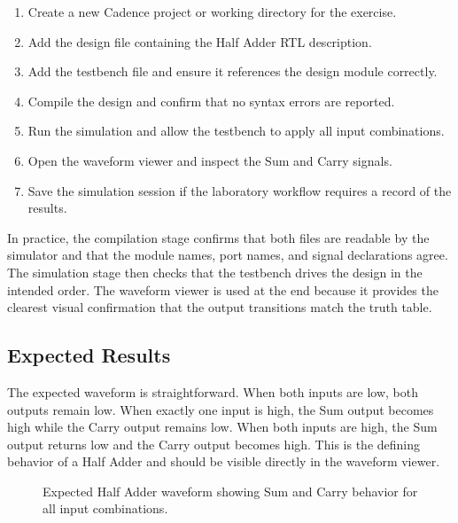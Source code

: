 \begin{enumerate}
    \item Create a new Cadence project or working directory for the exercise.
    \item Add the design file containing the Half Adder RTL description.
    \item Add the testbench file and ensure it references the design module correctly.
    \item Compile the design and confirm that no syntax errors are reported.
    \item Run the simulation and allow the testbench to apply all input combinations.
    \item Open the waveform viewer and inspect the Sum and Carry signals.
    \item Save the simulation session if the laboratory workflow requires a record of the results.
\end{enumerate}


\noindent In practice, the compilation stage confirms that both files are readable by the simulator
and that the module names, port names, and signal declarations agree. The simulation stage then
checks that the testbench drives the design in the intended order. The waveform viewer is used at the
end because it provides the clearest visual confirmation that the output transitions match the truth
table.

\subsection{Expected Results}
The expected waveform is straightforward. When both inputs are low, both outputs remain low. When
exactly one input is high, the Sum output becomes high while the Carry output remains low. When both
inputs are high, the Sum output returns low and the Carry output becomes high. This is the defining
behavior of a Half Adder and should be visible directly in the waveform viewer.\\

\begin{figure}[H]
    \centering
    \caption{Expected Half Adder waveform showing Sum and Carry behavior for all input combinations.}
    \label{fig:half_adder_waveform}
\end{figure}

